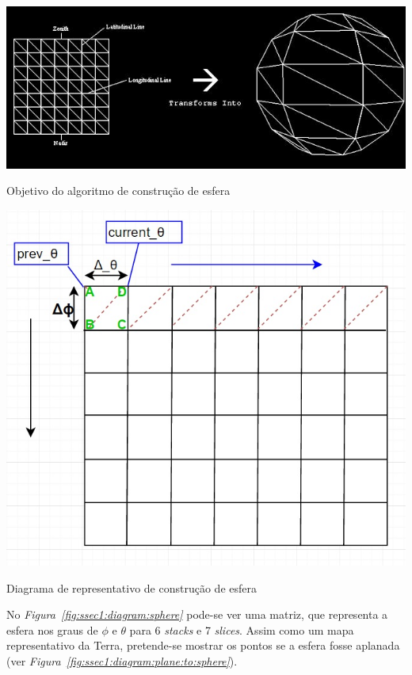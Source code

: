 \begin{center}
 	
 	\includegraphics[width=\textwidth,height=\textheight,keepaspectratio]{resources/sphere05.jpg}
 	\captionsetup{type=figure, width=0.8\linewidth}
	\caption{Objetivo do algoritmo de construção de esfera}
\label{fig:ssec1:diagram:plane:to:sphere} 
\end{center}



\begin{center}
 	
 	\includegraphics[keepaspectratio]{resources/esferaw.jpg}
 	\captionsetup{type=figure, width=0.8\linewidth}
	\caption{Diagrama de representativo de construção de esfera}
\label{fig:ssec1:diagram:sphere} 
\end{center}


No \emph{Figura~\ref{fig:ssec1:diagram:sphere}} pode-se ver uma matriz, que
representa a esfera nos graus de $\phi$ e $\theta$ para 6 \emph{stacks}
e 7 \emph{slices}. Assim como um mapa representativo da Terra, pretende-se
mostrar os pontos se a esfera fosse aplanada (ver
\emph{Figura~\ref{fig:ssec1:diagram:plane:to:sphere}}).

